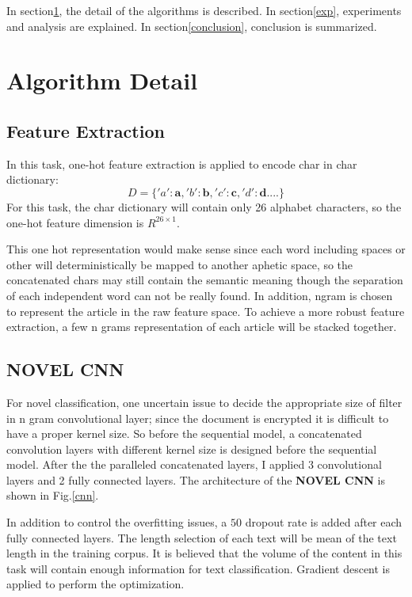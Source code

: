 \documentclass[a4paper]{article}
\begin{document}
In section\ref{algoDetail}, the detail of the algorithms is described. In section\ref{exp}, experiments and analysis are explained. In section\ref{conclusion}, conclusion is summarized.

\section{Algorithm Detail}\label{algoDetail}

\subsection{Feature Extraction}
In this task, one-hot feature extraction is applied to encode char in char dictionary:
\begin{equation}
D = \{'a': \mathbf{a},'b': \mathbf{b},'c': \mathbf{c},'d': \mathbf{d}....\}
\end{equation}
For this task, the char dictionary will contain only 26 alphabet characters, so the one-hot feature dimension is $R^{26 \times 1}$.

This one hot representation would make sense since each word including spaces or other will deterministically be mapped to another aphetic space, so the concatenated chars may still contain the semantic meaning though the separation of each independent word can not be really found. In addition, ngram is chosen to represent the article in the raw feature space. To achieve a more robust feature extraction, a few n grams representation of each article will be stacked together.

\subsection{NOVEL CNN}
For novel classification, one uncertain issue to decide the appropriate size of filter in n gram convolutional layer; since the document is encrypted it is difficult to have a proper kernel size. So before the sequential model, a concatenated convolution layers with different kernel size is designed before the sequential model. After the the paralleled concatenated layers, I applied 3 convolutional layers and 2 fully connected layers. The architecture of the \textbf{NOVEL CNN} is shown in Fig.\ref{cnn}.

In addition to control the overfitting issues, a $50$ dropout rate is added after each fully connected layers. The length selection of each text will be mean of the text length in the training corpus. It is believed that the volume of the content in this task will contain enough information for text classification. Gradient descent is applied to perform the optimization.
\end{document}
